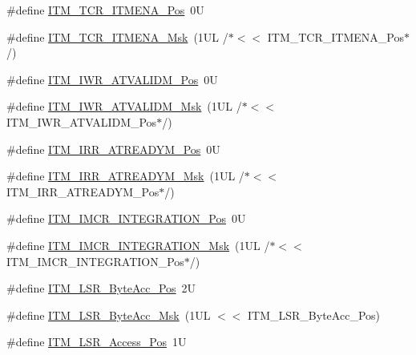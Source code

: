 \begin{DoxyCompactItemize}
\item 
\#define \mbox{\hyperlink{group___c_m_s_i_s___i_t_m_ga3286b86004bce7ffe17ee269f87f8d9d}{I\+T\+M\+\_\+\+T\+C\+R\+\_\+\+I\+T\+M\+E\+N\+A\+\_\+\+Pos}}~0U
\item 
\#define \mbox{\hyperlink{group___c_m_s_i_s___i_t_m_ga7dd53e3bff24ac09d94e61cb595cb2d9}{I\+T\+M\+\_\+\+T\+C\+R\+\_\+\+I\+T\+M\+E\+N\+A\+\_\+\+Msk}}~(1\+U\+L /$\ast$$<$$<$ I\+T\+M\+\_\+\+T\+C\+R\+\_\+\+I\+T\+M\+E\+N\+A\+\_\+\+Pos$\ast$/)
\item 
\#define \mbox{\hyperlink{group___c_m_s_i_s___i_t_m_ga04d3f842ad48f6a9127b4cecc963e1d7}{I\+T\+M\+\_\+\+I\+W\+R\+\_\+\+A\+T\+V\+A\+L\+I\+D\+M\+\_\+\+Pos}}~0U
\item 
\#define \mbox{\hyperlink{group___c_m_s_i_s___i_t_m_ga67b969f8f04ed15886727788f0e2ffd7}{I\+T\+M\+\_\+\+I\+W\+R\+\_\+\+A\+T\+V\+A\+L\+I\+D\+M\+\_\+\+Msk}}~(1\+U\+L /$\ast$$<$$<$ I\+T\+M\+\_\+\+I\+W\+R\+\_\+\+A\+T\+V\+A\+L\+I\+D\+M\+\_\+\+Pos$\ast$/)
\item 
\#define \mbox{\hyperlink{group___c_m_s_i_s___i_t_m_ga259edfd1d2e877a62e06d7a240df97f4}{I\+T\+M\+\_\+\+I\+R\+R\+\_\+\+A\+T\+R\+E\+A\+D\+Y\+M\+\_\+\+Pos}}~0U
\item 
\#define \mbox{\hyperlink{group___c_m_s_i_s___i_t_m_ga3dbc3e15f5bde2669cd8121a1fe419b9}{I\+T\+M\+\_\+\+I\+R\+R\+\_\+\+A\+T\+R\+E\+A\+D\+Y\+M\+\_\+\+Msk}}~(1\+U\+L /$\ast$$<$$<$ I\+T\+M\+\_\+\+I\+R\+R\+\_\+\+A\+T\+R\+E\+A\+D\+Y\+M\+\_\+\+Pos$\ast$/)
\item 
\#define \mbox{\hyperlink{group___c_m_s_i_s___i_t_m_ga08de02bf32caf48aaa29f7c68ff5d755}{I\+T\+M\+\_\+\+I\+M\+C\+R\+\_\+\+I\+N\+T\+E\+G\+R\+A\+T\+I\+O\+N\+\_\+\+Pos}}~0U
\item 
\#define \mbox{\hyperlink{group___c_m_s_i_s___i_t_m_ga8838bd3dd04c1a6be97cd946364a3fd2}{I\+T\+M\+\_\+\+I\+M\+C\+R\+\_\+\+I\+N\+T\+E\+G\+R\+A\+T\+I\+O\+N\+\_\+\+Msk}}~(1\+U\+L /$\ast$$<$$<$ I\+T\+M\+\_\+\+I\+M\+C\+R\+\_\+\+I\+N\+T\+E\+G\+R\+A\+T\+I\+O\+N\+\_\+\+Pos$\ast$/)
\item 
\#define \mbox{\hyperlink{group___c_m_s_i_s___i_t_m_gabfae3e570edc8759597311ed6dfb478e}{I\+T\+M\+\_\+\+L\+S\+R\+\_\+\+Byte\+Acc\+\_\+\+Pos}}~2U
\item 
\#define \mbox{\hyperlink{group___c_m_s_i_s___i_t_m_ga91f492b2891bb8b7eac5b58de7b220f4}{I\+T\+M\+\_\+\+L\+S\+R\+\_\+\+Byte\+Acc\+\_\+\+Msk}}~(1\+U\+L $<$$<$ I\+T\+M\+\_\+\+L\+S\+R\+\_\+\+Byte\+Acc\+\_\+\+Pos)
\item 
\#define \mbox{\hyperlink{group___c_m_s_i_s___i_t_m_ga144a49e12b83ad9809fdd2769094fdc0}{I\+T\+M\+\_\+\+L\+S\+R\+\_\+\+Access\+\_\+\+Pos}}~1U
$$
\end{DoxyCompactItemize}
